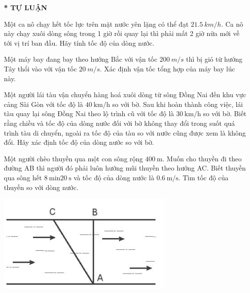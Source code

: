 \textbf{* TỰ LUẬN}\\
\setcounter{ex}{0}
\begin{ex}
	Một ca nô chạy hết tốc lực trên mặt nước yên lặng có thể đạt $\SI{21,5}{km/h}$. Ca nô này chạy xuôi dòng sông trong 1 giờ rồi quay lại thì phải mất 2 giờ nữa mới về tới vị trí ban đầu. Hãy tính tốc độ của dòng nước.	
\end{ex}
\begin{ex}
	Một máy bay đang bay theo hướng Bắc với vận tốc $\SI{200}{m/s}$ thì bị gió từ hướng Tây thổi vào với vận tốc $\SI{20}{m/s}$. Xác định vận tốc tổng hợp của máy bay lúc này.
	\loigiai{}
\end{ex}
\begin{ex}
	Một người lái tàu vận chuyển hàng hoá xuôi dòng từ sông Đồng Nai đến khu vực cảng Sài Gòn với tốc độ là $\SI{40}{\kilo\meter/\hour}$ so với bờ. Sau khi hoàn thành công việc, lái tàu quay lại sông Đồng Nai theo lộ trình cũ với tốc độ là $\SI{30}{\kilo\meter/\hour}$ so với bờ. Biết rằng chiều và tốc độ của dòng nước đối với bờ không thay đổi trong suốt quá trình tàu di chuyển, ngoài ra tốc độ của tàu so với nước cũng được xem là không đổi. Hãy xác định tốc độ của dòng nước so với bờ.
\end{ex}
\begin{ex}
	Một người chèo thuyền qua một con sông rộng $\SI{400}{\meter}$. Muốn cho thuyền đi theo đường AB thì người đó phải luôn hướng mũi thuyền theo hướng AC. Biết thuyền qua sông hết $\SI{8}{\minute} \SI{20}{\second}$ và tốc độ của dòng nước là $\SI{0.6}{\meter/\second}$. Tìm tốc độ của thuyền so với dòng nước.
	\begin{center}
		\includegraphics[width=0.35\linewidth]{figs/BAI5-1}
	\end{center}
\end{ex}
